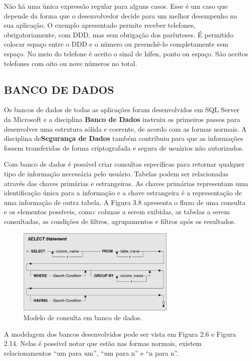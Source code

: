 \documentclass[
  12pt,				%
  openany,
  oneside,
  a4paper,			%
  english,			%
  brazil
]{article}
\numberwithin{figure}{section}
\numberwithin{table}{section}
\begin{document}
Não há uma única expressão regular para alguns casos. Esse é um caso que depende da forma que o desenvolvedor decide para um melhor desempenho na sua aplicação. O exemplo apresentado permite receber telefones, obrigatoriamente, com DDD, mas sem obrigação dos parênteses. É permitido colocar espaço entre o DDD e o número ou preenchê-lo completamente sem espaço. No meio do telefone é aceito o sinal de hífen, ponto ou espaço. São aceitos telefones com oito ou nove números no total.



\subsection{BANCO DE DADOS}

Os bancos de dados de todas as aplicações foram desenvolvidos em SQL Server da Microsoft e a disciplina \textbf{Banco de Dados} instruiu os primeiros passos para desenvolver uma estrutura sólida e coerente, de acordo com as formas normais. A disciplina de\textbf{Segurança de Dados} também contribuiu para que as informações fossem transferidas de forma criptografada e segura de usuários não autorizados.

Com banco de dados é possível criar consultas específicas para retornar qualquer tipo de informação necessária pelo usuário. Tabelas podem ser relacionadas através das chaves primárias e estrangeiras. As chaves primárias representam uma identificação única para a informação e a chave estrangeira é a representação de uma informação de outra tabela. A Figura 3.8 apresenta o fluxo de uma consulta e os elementos possíveis, como: colunas a serem exibidas, as tabelas a serem consultadas, as condições de filtros, agrupamentos e filtros após os resultados.

\begin{figure}[!htb]
\centering
\includegraphics[width=0.7\textwidth]{figura38}
\caption{Modelo de consulta em banco de dados.}
\end{figure}
A modelagem dos bancos desenvolvidos pode ser vista em Figura 2.6 e Figura 2.14.
Nelas é possível notar que estão nas formas normais, existem relacionamentos “um para um”,
“um para n” e “n para n”.
\end{document}
